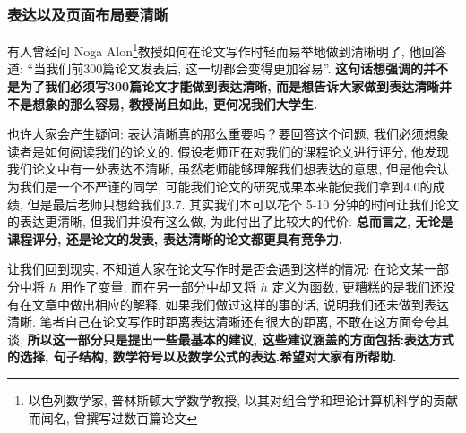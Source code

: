 \documentclass{formatBook}
\begin{document}
\subsubsection{表达以及页面布局要清晰}
有人曾经问 Noga Alon\footnote{以色列数学家, 普林斯顿大学数学教授, 以其对组合学和理论计算机科学的贡献而闻名, 曾撰写过数百篇论文}教授如何在论文写作时轻而易举地做到清晰明了, 他回答道: {``}当我们前300篇论文发表后, 这一切都会变得更加容易''\cite{pakhow}. \textbf{这句话想强调的并不是为了我们必须写300篇论文才能做到表达清晰, 而是想告诉大家做到表达清晰并不是想象的那么容易, 教授尚且如此, 更何况我们大学生.} \par
也许大家会产生疑问: 表达清晰真的那么重要吗？要回答这个问题, 我们必须想象读者是如何阅读我们的论文的. 假设老师正在对我们的课程论文进行评分, 他发现我们论文中有一处表达不清晰, 虽然老师能够理解我们想表达的意思, 但是他会认为我们是一个不严谨的同学, 可能我们论文的研究成果本来能使我们拿到4.0的成绩, 但是最后老师只想给我们3.7. 其实我们本可以花个 5-10 分钟的时间让我们论文的表达更清晰, 但我们并没有这么做, 为此付出了比较大的代价. \textbf{总而言之, 无论是课程评分, 还是论文的发表, 表达清晰的论文都更具有竞争力.} \par
让我们回到现实, 不知道大家在论文写作时是否会遇到这样的情况: 在论文某一部分中将 $h$ 用作了变量, 而在另一部分中却又将 $h$ 定义为函数, 更糟糕的是我们还没有在文章中做出相应的解释. 如果我们做过这样的事的话, 说明我们还未做到表达清晰. 笔者自己在论文写作时距离表达清晰还有很大的距离, 不敢在这方面夸夸其谈, \textbf{所以这一部分只是提出一些最基本的建议, {这些建议涵盖的方面包括:表达方式的选择, 句子结构, 数学符号以及数学公式的表达}.希望对大家有所帮助. }
\end{document}
